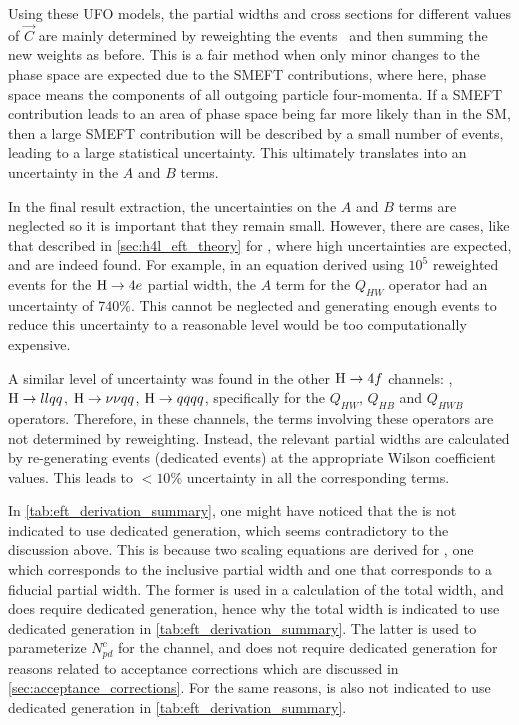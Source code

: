 Using these UFO models, the partial widths and cross sections for different values of $\vec{C}$ are mainly determined by reweighting the events~\cite{Mattelaer:2016gcx} and then summing the new weights as before. This is a fair method when only minor changes to the phase space are expected due to the SMEFT contributions, where here, phase space means the components of all outgoing particle four-momenta. If a SMEFT contribution leads to an area of phase space being far more likely than in the SM, then a large SMEFT contribution will be described by a small number of events, leading to a large statistical uncertainty. This ultimately translates into an uncertainty in the $A$ and $B$ terms.

In the final result extraction, the uncertainties on the $A$ and $B$ terms are neglected so it is important that they remain small. However, there are cases, like that described in \cref{sec:h4l_eft_theory} for \Hfl, where high uncertainties are expected, and are indeed found. For example, in an equation derived using $10^5$ reweighted events for the $\mathrm{H} \to 4e$ partial width, the $A$ term for the $Q_{HW}$ operator had an uncertainty of 740\%. This cannot be neglected and generating enough events to reduce this uncertainty to a reasonable level would be too computationally expensive.

A similar level of uncertainty was found in the other $\mathrm{H} \to 4f$ channels: \Hlnulnu, $\mathrm{H} \to llqq$, $\mathrm{H} \to \nu\nu qq$, $\mathrm{H} \to qqqq$, specifically for the $Q_{HW}$, $Q_{HB}$ and $Q_{HWB}$ operators. Therefore, in these channels, the terms involving these operators are not determined by reweighting. Instead, the relevant partial widths are calculated by re-generating events (dedicated events) at the appropriate Wilson coefficient values. This leads to $<10\%$ uncertainty in all the corresponding terms. 

In \cref{tab:eft_derivation_summary}, one might have noticed that the \Hfl is not indicated to use dedicated generation, which seems contradictory to the discussion above. This is because two scaling equations are derived for \Hfl, one which corresponds to the inclusive partial width and one that corresponds to a fiducial partial width. The former is used in a calculation of the total width, and does require dedicated generation, hence why the total width is indicated to use dedicated generation in \cref{tab:eft_derivation_summary}. The latter is used to parameterize $N_{pd}^c$ for the \Hfl channel, and does not require dedicated generation for reasons related to acceptance corrections which are discussed in \cref{sec:acceptance_corrections}. For the same reasons, \Hlnulnu is also not indicated to use dedicated generation in \cref{tab:eft_derivation_summary}.

